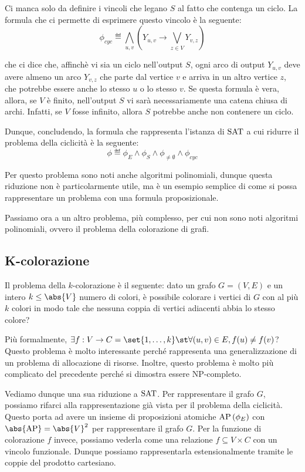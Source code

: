 Ci manca solo da definire i vincoli che legano \(S\) al fatto che contenga un ciclo. La formula che ci permette di esprimere questo vincolo è la seguente:
\[\phi_{cyc} \eqdef \bigwedge_{u,v} (Y_{u,v}\to \bigvee_{z \in V} Y_{v,z})\]

che ci dice che, affinchè vi sia un ciclo nell'output \(S\), ogni arco di output \(Y_{u,v}\) deve avere almeno un arco \(Y_{v,z}\) che parte dal vertice \(v\) e arriva in un altro vertice \(z\), che potrebbe essere anche lo stesso \(u\) o lo stesso \(v\).
Se questa formula è vera, allora, se \(V\) è finito, nell'output \(S\) vi sarà necessariamente una catena chiusa di archi. Infatti, se \(V\) fosse infinito, allora \(S\) potrebbe anche non contenere un ciclo.

Dunque, concludendo, la formula che rappresenta l'istanza di \(\Sat\) a cui ridurre il problema della ciclicità è la seguente:
\[\phi \eqdef \phi_E \land \phi_S \land \phi_{\neq \emptyset} \land \phi_{cyc}\]

Per questo problema sono noti anche algoritmi polinomiali, dunque questa riduzione non è particolarmente utile, ma è un esempio semplice di come si possa rappresentare un problema con una formula proposizionale.

Passiamo ora a un altro problema, più complesso, per cui non sono noti algoritmi polinomiali, ovvero il problema della colorazione di grafi.

\subsection{K-colorazione}
Il problema della \(k\)-colorazione è il seguente: dato un grafo \(G=(V,E)\) e un intero \(k\leq \abs{V}\) numero di colori, è possibile colorare i vertici di \(G\) con al più \(k\) colori in modo tale che nessuna coppia di vertici adiacenti abbia lo stesso colore?

Più formalmente, \(\exists f:V\to C = \set{1,\dots,k} \st \forall (u,v)\in E, f(u)\neq f(v)\)?
Questo problema è molto interessante perché rappresenta una generalizzazione di un problema di allocazione di risorse. Inoltre, questo problema è molto più complicato del precedente perché si dimostra essere NP-completo.

Vediamo dunque una sua riduzione a \(\Sat\). Per rappresentare il grafo \(G\), possiamo rifarci alla rappresentazione già vista per il problema della ciclicità. Questo porta ad avere un insieme di proposizioni atomiche \(\AP[\phi_E]\) con \(\abs{\AP} = \abs{V}^2\) per rappresentare il grafo \(G\).
Per la funzione di colorazione \(f\) invece, possiamo vederla come una relazione \(f\subseteq V\times C\) con un vincolo funzionale. Dunque possiamo rappresentarla estensionalmente tramite le coppie del prodotto cartesiano.

